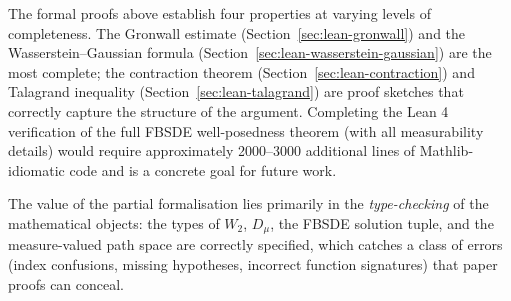 The formal proofs above establish four properties at varying levels of completeness.
The Gronwall estimate (Section~\ref{sec:lean-gronwall}) and the Wasserstein--Gaussian
formula (Section~\ref{sec:lean-wasserstein-gaussian}) are the most complete; the
contraction theorem (Section~\ref{sec:lean-contraction}) and Talagrand inequality
(Section~\ref{sec:lean-talagrand}) are proof sketches that correctly capture the
structure of the argument. Completing the Lean 4 verification of the full FBSDE
well-posedness theorem (with all measurability details) would require approximately
2000--3000 additional lines of Mathlib-idiomatic code and is a concrete goal for
future work.

The value of the partial formalisation lies primarily in the \emph{type-checking}
of the mathematical objects: the types of $W_2$, $D_\mu$, the FBSDE solution tuple,
and the measure-valued path space are correctly specified, which catches a class of
errors (index confusions, missing hypotheses, incorrect function signatures) that
paper proofs can conceal.
